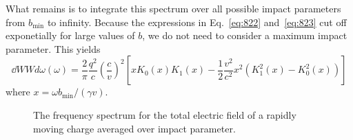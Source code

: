 What remains is to integrate this spectrum over all possible impact
parameters from $b_\mathrm{min}$ to infinity.  Because the expressions
in Eq.~\ref{eq:822} and~\ref{eq:823} cut off exponetially for large
values of $b$, we do not need to consider a maximum impact parameter.
This yields
\begin{equation}
\dd{W}{W d\omega}(\omega) = \frac{2}{\pi} \frac{q^2}{c} \left (
  \frac{c}{v} \right )^2 \left [ x K_0(x) K_1(x) - \frac{1}{2}
  \frac{v^2}{c^2} x^2 \left ( K_1^2(x) - K_0^2(x) \right ) \right ]
\end{equation}
where $x=\omega b_\mathrm{min}/(\gamma v)$.
\begin{figure}
\begin{center}
\end{center}
\caption{The frequency spectrum for the total electric field of a
  rapidly moving charge averaged over impact parameter.}
\label{fig:bremspec_tot}
\end{figure}


